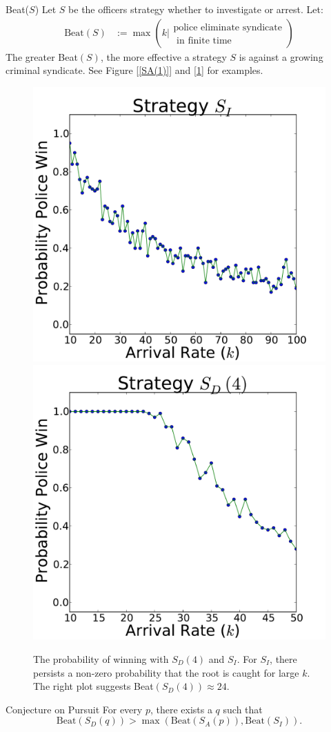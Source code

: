 \documentclass[final]{beamer}
\newlength{\onecolwid}
\begin{document}
\begin{frame}[t]
\begin{columns}[t]
\begin{column}{\onecolwid}
\begin{block}{Beat($S$)}
Let $S$ be the officers strategy whether to investigate or arrest.  Let:
\begin{align*}
\textrm{Beat}(S) &:=\max\left(k | \substack{\textrm{police eliminate syndicate}\\ \textrm{  in finite time}}\right)
\end{align*}
The greater Beat$(S)$, the more effective a strategy $S$ is against a growing criminal syndicate.  See Figure [\ref{SA(1)}] and [\ref{otherbeats}] for examples.
 \end{block}

 \begin{figure}
\includegraphics[width=0.5\linewidth]{ImprovedPlotS1.pdf}
\includegraphics[width=0.5\linewidth]{ImprovedPlotS3.pdf}
 \caption{The probability of winning with $S_D(4)$ and $S_I$.  For $S_I$, there persists a non-zero probability that the root is caught for large $k$.  The right plot suggests Beat$(S_D(4)) \approx 24$.}
 \label{otherbeats}
 \end{figure}
\begin{block}{Conjecture on Pursuit}
For every $p$, there exists a $q$ such that
$$
\textrm{Beat}(S_{D}(q)) > \max(\textrm{Beat}(S_A(p)), \textrm{Beat}(S_I)).
$$
\end{block}


\end{column}
\end{columns}
\end{frame}
\end{document}

